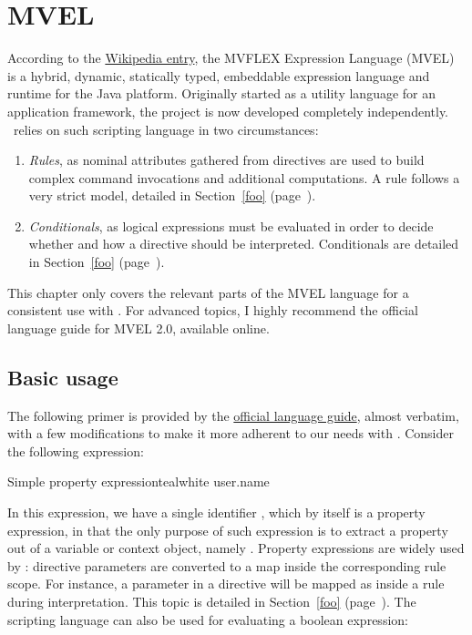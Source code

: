 \chapter{MVEL}
\label{chap:mvel}

According to the \href{https://en.wikipedia.org/wiki/MVEL}{Wikipedia entry}, the MVFLEX Expression Language (MVEL) is a hybrid, dynamic, statically typed, embeddable expression language and runtime for the Java platform. Originally started as a utility language for an application framework, the project is now developed completely independently. \arara\ relies on such scripting language in two circumstances:

\begin{enumerate}
\item\emph{Rules}, as nominal attributes gathered from directives are used to build complex command invocations and additional computations. A rule follows a very strict model, detailed in Section~\ref{foo} (page~\pageref{foo}).

\item\emph{Conditionals}, as logical expressions must be evaluated in order to decide whether and how a directive should be interpreted. Conditionals are detailed in Section~\ref{foo} (page~\pageref{foo}).
\end{enumerate}

This chapter only covers the relevant parts of the MVEL language for a consistent use with \arara. For advanced topics, I highly recommend the official language guide for MVEL 2.0, available online.

\section{Basic usage}
\label{sec:mvelbasicusage}

The following primer is provided by the \href{https://mvel.documentnode.com/}{official language guide}, almost verbatim, with a few modifications to make it more adherent to our needs with \arara. Consider the following expression:

\begin{codebox}{Simple property expression}{teal}{\icnote}{white}
user.name
\end{codebox}

In this expression, we have a single identifier , which by itself is a property expression, in that the only purpose of such expression is to extract a property out of a variable or context object, namely . Property expressions are widely used by \arara: directive parameters are converted to a map inside the corresponding rule scope. For instance, a parameter  in a directive will be mapped as  inside a rule during interpretation. This topic is detailed in Section~\ref{foo} (page~\pageref{foo}). The scripting language can also be used for evaluating a boolean expression:

